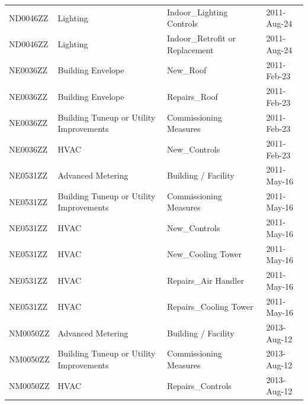 \documentclass[12pt]{article}
\begin{document}
\begin{longtable}{lp{4cm}p{4cm}p{3cm}}
ND0046ZZ         & Lighting                                & Indoor\_Lighting Controls                 & 2011-Aug-24                   \\
ND0046ZZ         & Lighting                                & Indoor\_Retrofit or Replacement           & 2011-Aug-24                   \\
NE0036ZZ         & Building Envelope                       & New\_Roof                                 & 2011-Feb-23                   \\
NE0036ZZ         & Building Envelope                       & Repairs\_Roof                             & 2011-Feb-23                   \\
NE0036ZZ         & Building Tuneup or Utility Improvements & Commissioning Measures                    & 2011-Feb-23                   \\
NE0036ZZ         & HVAC                                    & New\_Controls                             & 2011-Feb-23                   \\
NE0531ZZ         & Advanced Metering                       & Building / Facility                       & 2011-May-16                   \\
NE0531ZZ         & Building Tuneup or Utility Improvements & Commissioning Measures                    & 2011-May-16                   \\
NE0531ZZ         & HVAC                                    & New\_Controls                             & 2011-May-16                   \\
NE0531ZZ         & HVAC                                    & New\_Cooling Tower                        & 2011-May-16                   \\
NE0531ZZ         & HVAC                                    & Repairs\_Air Handler                      & 2011-May-16                   \\
NE0531ZZ         & HVAC                                    & Repairs\_Cooling Tower                    & 2011-May-16                   \\
NM0050ZZ         & Advanced Metering                       & Building / Facility                       & 2013-Aug-12                   \\
NM0050ZZ         & Building Tuneup or Utility Improvements & Commissioning Measures                    & 2013-Aug-12                   \\
NM0050ZZ         & HVAC                                    & Repairs\_Controls                         & 2013-Aug-12                   \\

\end{longtable}
\end{document}
